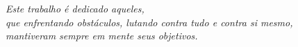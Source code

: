 \begin{dedicatoria}
  \vspace*{\fill}
   \centering
   \noindent
   \textit{ Este trabalho é dedicado aqueles,\\
   que enfrentando obstáculos, lutando contra tudo e contra si mesmo, \\ 
   mantiveram sempre em mente seus objetivos.} 
   \vspace*{\fill}
\end{dedicatoria}
